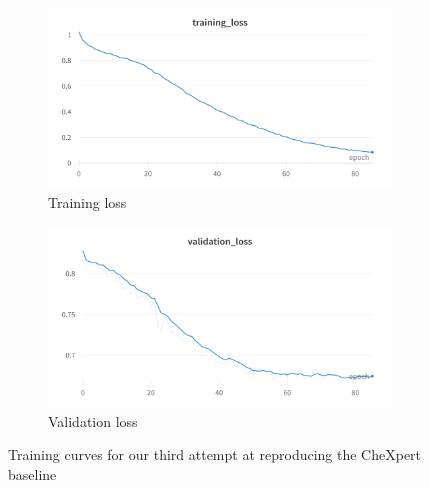 \documentclass[11pt]{article}
\begin{document}
            \begin{figure}[H]
                 \centering
                 \begin{subfigure}[b]{0.45\textwidth}
                     \centering
                     \includegraphics[width=\textwidth]{plots/chexpert_training_loss3}
                     \caption{Training loss}
                     \vspace{4ex}
                     \label{fig:chexpert_training_loss3}
                 \end{subfigure}
                 \hfill
                 \begin{subfigure}[b]{0.45\textwidth}
                     \centering
                     \includegraphics[width=\textwidth]{plots/chexpert_validation_loss3}
                     \caption{Validation loss}
                     \vspace{4ex}
                     \label{fig:chexpert_validation_loss3}
                 \end{subfigure}

                 \caption{Training curves for our third attempt at reproducing the CheXpert baseline}

            \end{figure}
\end{document}
